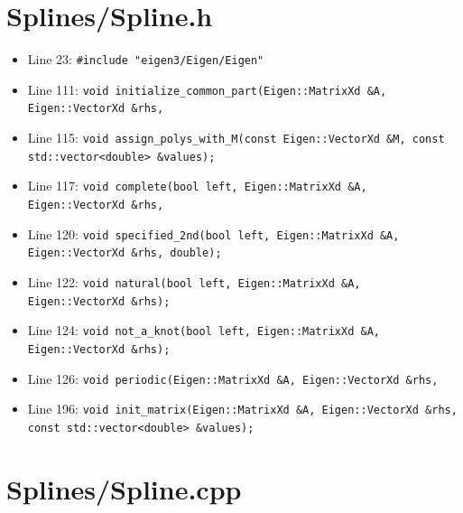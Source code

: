 \documentclass[a4paper,7pt,onecolumn,oneside]{article}
\begin{document}
\section{Splines/Spline.h}

\begin{itemize}
    \item Line 23: \texttt{\#include "eigen3/Eigen/Eigen"}
    \item Line 111: \texttt{void initialize\_common\_part(Eigen::MatrixXd \&A, Eigen::VectorXd \&rhs,}
    \item Line 115: \texttt{void assign\_polys\_with\_M(const Eigen::VectorXd \&M, const std::vector<double> \&values);}
    \item Line 117: \texttt{void complete(bool left, Eigen::MatrixXd \&A, Eigen::VectorXd \&rhs,}
    \item Line 120: \texttt{void specified\_2nd(bool left, Eigen::MatrixXd \&A, Eigen::VectorXd \&rhs, double);}
    \item Line 122: \texttt{void natural(bool left, Eigen::MatrixXd \&A, Eigen::VectorXd \&rhs);}
    \item Line 124: \texttt{void not\_a\_knot(bool left, Eigen::MatrixXd \&A, Eigen::VectorXd \&rhs);}
    \item Line 126: \texttt{void periodic(Eigen::MatrixXd \&A, Eigen::VectorXd \&rhs,}
    \item Line 196: \texttt{void init\_matrix(Eigen::MatrixXd \&A, Eigen::VectorXd \&rhs, const std::vector<double> \&values);}
\end{itemize}

\section{Splines/Spline.cpp}
\end{document}
